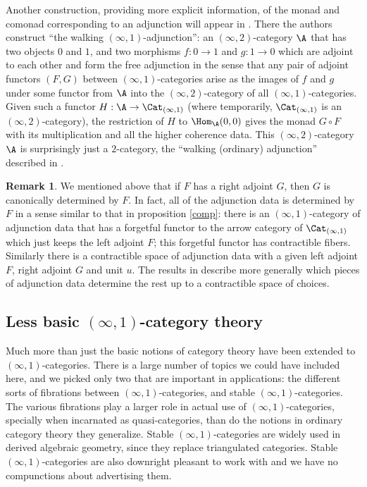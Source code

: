 \documentclass[12pt]{amsart}
\theoremstyle{definition} \newtheorem{definition}[theorem]{Definition}
\newtheorem{remark}[theorem]{Remark}
\numberwithin{equation}{section}
\newcommand{\oo}{\infty}
\newcommand{\io}{$(\oo,1)$}
\newcommand{\Catio}{\Cat_{(\oo,1)}}
\begin{document}
Another construction, providing more explicit information, of the
monad and comonad corresponding to an adjunction will appear in
\cite{Adjunctions}. There the authors construct ``the walking
\io-adjunction'': an $(\oo,2)$-category $\A$ that has two objects $0$
and $1$, and two morphisms $f : 0 \to 1$ and $g:1 \to 0$ which are
adjoint to each other and form the free adjunction in the sense that
any pair of adjoint functors $(F,G)$ between \io-categories arise as
the images of $f$ and $g$ under some functor from $\A$ into the
$(\oo,2)$-category of all \io-categories. Given such a functor $H : \A
\to \Catio$ (where temporarily, $\Catio$ is an $(\oo,2)$-category),
the restriction of $H$ to $\Hom_\A(0,0)$ gives the monad $G \circ F$
with its multiplication and all the higher coherence data. This
$(\oo,2)$-category $\A$ is surprisingly just a $2$-category, the
``walking (ordinary) adjunction'' described in \cite{FreeAdj}.

\begin{remark}
  We mentioned above that if $F$ has a right adjoint $G$, then $G$ is
  canonically determined by $F$. In fact, all of the adjunction data
  is determined by $F$ in a sense similar to that in proposition
  \ref{comp}: there is an \io-category of adjunction data that has a
  forgetful functor to the arrow category of $\Catio$ which just keeps
  the left adjoint $F$; this forgetful functor has contractible
  fibers.  Similarly there is a contractible space of adjunction data
  with a given left adjoint $F$, right adjoint $G$ and unit $u$. The
  results in \cite{Adjunctions} describe more generally which pieces
  of adjunction data determine the rest up to a contractible space of
  choices.
\end{remark}

\subsection{Less basic \io-category theory}

Much more than just the basic notions of category theory have been
extended to \io-categories. There is a large number of topics we could
have included here, and we picked only two that are important in
applications: the different sorts of fibrations between
\io-categories, and stable \io-categories. The various fibrations play
a larger role in actual use of \io-categories, specially when
incarnated as quasi-categories, than do the notions in ordinary
category theory they generalize. Stable \io-categories are widely used
in derived algebraic geometry, since they replace triangulated
categories. Stable \io-categories are also downright pleasant to work
with and we have no compunctions about advertising them.
\end{document}
